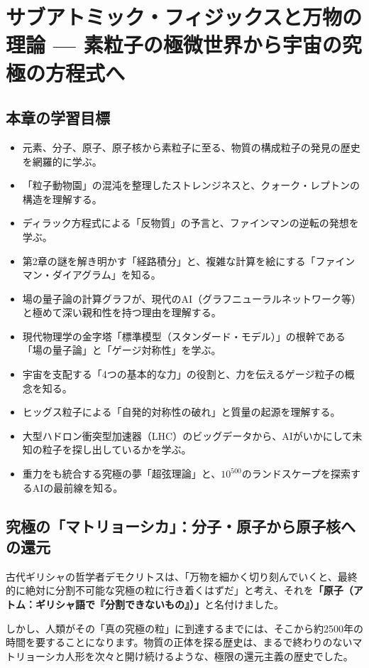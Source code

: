\chapter{サブアトミック・フィジックスと万物の理論 --- 素粒子の極微世界から宇宙の究極の方程式へ}

\section*{本章の学習目標}
\begin{itemize}
\item 元素、分子、原子、原子核から素粒子に至る、物質の構成粒子の発見の歴史を網羅的に学ぶ。
\item 「粒子動物園」の混沌を整理したストレンジネスと、クォーク・レプトンの構造を理解する。
\item ディラック方程式による「反物質」の予言と、ファインマンの逆転の発想を学ぶ。
\item 第2章の謎を解き明かす「経路積分」と、複雑な計算を絵にする「ファインマン・ダイアグラム」を知る。
\item 場の量子論の計算グラフが、現代のAI（グラフニューラルネットワーク等）と極めて深い親和性を持つ理由を理解する。
\item 現代物理学の金字塔「標準模型（スタンダード・モデル）」の根幹である「場の量子論」と「ゲージ対称性」を学ぶ。
\item 宇宙を支配する「4つの基本的な力」の役割と、力を伝えるゲージ粒子の概念を知る。
\item ヒッグス粒子による「自発的対称性の破れ」と質量の起源を理解する。
\item 大型ハドロン衝突型加速器（LHC）のビッグデータから、AIがいかにして未知の粒子を探し出しているかを学ぶ。
\item 重力をも統合する究極の夢「超弦理論」と、\(10^{500}\)のランドスケープを探索するAIの最前線を知る。
\end{itemize}

\section{究極の「マトリョーシカ」：分子・原子から原子核への還元}

古代ギリシャの哲学者デモクリトスは、「万物を細かく切り刻んでいくと、最終的に絶対に分割不可能な究極の粒に行き着くはずだ」と考え、それを\textbf{「原子（アトム：ギリシャ語で『分割できないもの』）」}と名付けました。

しかし、人類がその「真の究極の粒」に到達するまでには、そこから約2500年の時間を要することになります。物質の正体を探る歴史は、まるで終わりのないマトリョーシカ人形を次々と開け続けるような、極限の還元主義の歴史でした。

